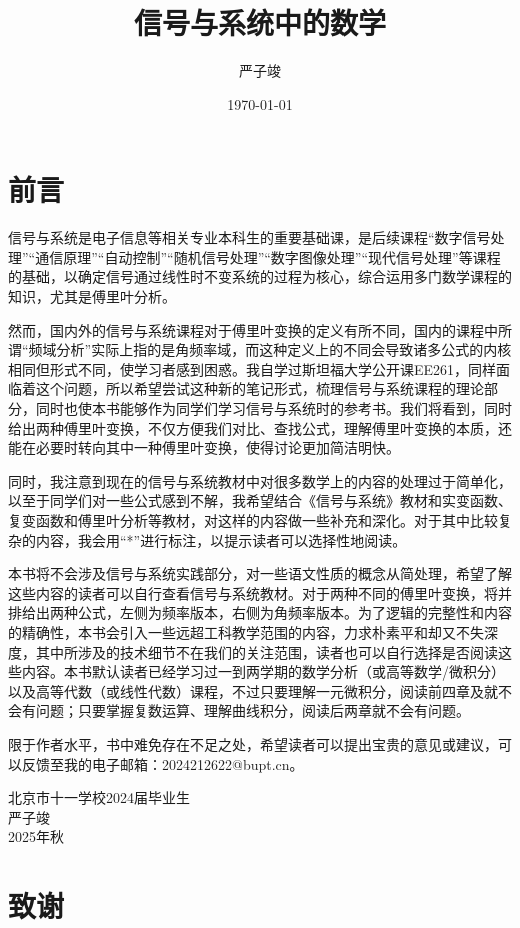 \documentclass{ctexbook}
\title{信号与系统中的数学}
\author{严子竣}
\date{\today}
\begin{document}
\frontmatter%
\chapter*{前言}
信号与系统是电子信息等相关专业本科生的重要基础课，是后续课程“数字信号处理”“通信原理”“自动控制”“随机信号处理”“数字图像处理”“现代信号处理”等课程的基础，以确定信号通过线性时不变系统的过程为核心，综合运用多门数学课程的知识，尤其是傅里叶分析。

然而，国内外的信号与系统课程对于傅里叶变换的定义有所不同，国内的课程中所谓“频域分析”实际上指的是角频率域，而这种定义上的不同会导致诸多公式的内核相同但形式不同，使学习者感到困惑。我自学过斯坦福大学公开课EE261，同样面临着这个问题，所以希望尝试这种新的笔记形式，梳理信号与系统课程的理论部分，同时也使本书能够作为同学们学习信号与系统时的参考书。我们将看到，同时给出两种傅里叶变换，不仅方便我们对比、查找公式，理解傅里叶变换的本质，还能在必要时转向其中一种傅里叶变换，使得讨论更加简洁明快。

同时，我注意到现在的信号与系统教材中对很多数学上的内容的处理过于简单化，以至于同学们对一些公式感到不解，我希望结合《信号与系统》教材和实变函数、复变函数和傅里叶分析等教材，对这样的内容做一些补充和深化。对于其中比较复杂的内容，我会用“*”进行标注，以提示读者可以选择性地阅读。

本书将不会涉及信号与系统实践部分，对一些语文性质的概念从简处理，希望了解这些内容的读者可以自行查看信号与系统教材。对于两种不同的傅里叶变换，将并排给出两种公式，左侧为频率版本，右侧为角频率版本。为了逻辑的完整性和内容的精确性，本书会引入一些远超工科教学范围的内容，力求朴素平和却又不失深度，其中所涉及的技术细节不在我们的关注范围，读者也可以自行选择是否阅读这些内容。本书默认读者已经学习过一到两学期的数学分析（或高等数学/微积分）以及高等代数（或线性代数）课程，不过只要理解一元微积分，阅读前四章及就不会有问题；只要掌握复数运算、理解曲线积分，阅读后两章就不会有问题。

限于作者水平，书中难免存在不足之处，希望读者可以提出宝贵的意见或建议，可以反馈至我的电子邮箱：2024212622@bupt.cn。

{
\raggedleft{}
北京市十一学校2024届毕业生\\
严子竣\\
2025年秋\\
}

\chapter*{致谢}
\end{document}
